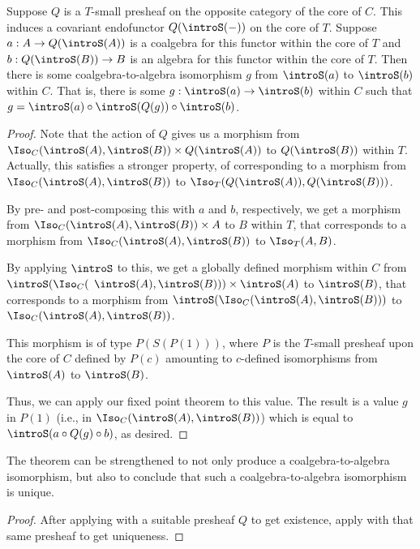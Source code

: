 \begin{theorem}\label{CoreCoalgToAlgExist}
Suppose $Q$ is a $T$-small presheaf on the opposite category of the core of $C$. This induces a covariant endofunctor $Q(\introS(-))$ on the core of $T$. Suppose $a : A \to Q(\introS(A))$ is a coalgebra for this functor within the core of $T$ and $b : Q(\introS(B)) \to B$ is an algebra for this functor within the core of $T$. Then there is some coalgebra-to-algebra isomorphism $g$ from $\introS(a)$ to $\introS(b)$ within $C$. That is, there is some $g : \introS(a) \to \introS(b)$ within $C$ such that $g = \introS(a) \circ \introS(Q(g)) \circ \introS(b)$.
\end{theorem}
\begin{proof}
Note that the action of $Q$ gives us a morphism from $\Iso_{C}(\introS(A), \introS(B)) \times Q(\introS(A))$ to $Q(\introS(B))$ within $T$. Actually, this satisfies a stronger property, of corresponding to a morphism from $\Iso_{C}(\introS(A), \introS(B))$ to $\Iso_T(Q(\introS(A)), Q(\introS(B)))$.

By pre- and post-composing this with $a$ and $b$, respectively, we get a morphism from $\Iso_C(\introS(A), \introS(B)) \times A$ to $B$ within $T$, that corresponds to a morphism from $\Iso_C(\introS(A), \introS(B))$ to $\Iso_T(A, B)$.

By applying $\introS$ to this, we get a globally defined morphism within $C$ from $\introS(\Iso_C($ $\introS(A), \introS(B))) \times \introS(A)$ to $\introS(B)$, that corresponds to a morphism from $\introS(\Iso_C(\introS(A), \introS(B)))$ to $\Iso_C(\introS(A), \introS(B))$.

This morphism is of type $P(S(P(1)))$, where $P$ is the $T$-small presheaf upon the core of $C$ defined by $P(c)$ amounting to $c$-defined isomorphisms from $\introS(A)$ to $\introS(B)$.

Thus, we can apply our fixed point theorem  to this value. The result is a value $g$ in $P(1)$ (i.e., in $\Iso_C(\introS(A), \introS(B))$) which is equal to $\introS(a \circ Q(g) \circ b)$, as desired.

\end{proof}

\begin{theorem}
The theorem  can be strengthened to not only produce a coalgebra-to-algebra isomorphism, but also to conclude that such a coalgebra-to-algebra isomorphism is unique.
\end{theorem}
\begin{proof}
After applying  with a suitable presheaf $Q$ to get existence, apply  with that same presheaf to get uniqueness.
\end{proof}

